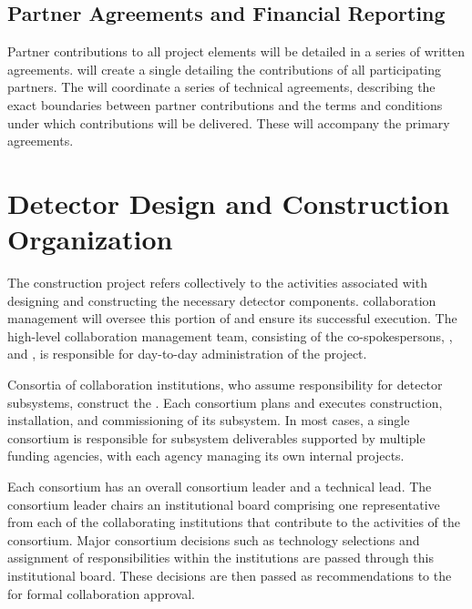 \subsection{Partner Agreements and Financial Reporting}
\label{sec:dune_agreements}

Partner contributions to all project elements will be detailed 
in a series of written agreements.   will create a single  
detailing the contributions of all participating partners.  
 The   will coordinate a series of technical agreements, describing the exact 
boundaries between partner contributions and the terms and 
conditions under which contributions will be delivered. These will accompany
 the primary agreements.   

\section{Detector Design and Construction Organization}
\label{sec:es-tc-det-const}

The   construction project refers collectively 
to the activities associated with designing and constructing the
necessary detector components.   collaboration management 
will oversee this portion of  and 
ensure its successful execution.  The high-level  
collaboration management team, consisting of the co-spokespersons, 
, and , is responsible for day-to-day 
administration of the project.  

Consortia of collaboration institutions, who assume responsibility 
for detector subsystems, construct the  . Each consortium plans and executes 
construction, installation, and commissioning of its subsystem.  In most cases, a single consortium is responsible for subsystem deliverables supported by 
multiple funding agencies, with each agency managing its own internal projects. 

Each consortium has an overall consortium leader 
and a technical lead.  The consortium leader chairs an institutional 
board comprising one representative from each of the collaborating 
institutions that contribute to the activities of the consortium.  Major 
consortium decisions such as technology selections and assignment of 
responsibilities within the institutions are passed through this institutional 
board.  These decisions are then passed as recommendations to 
the   for formal collaboration approval.

